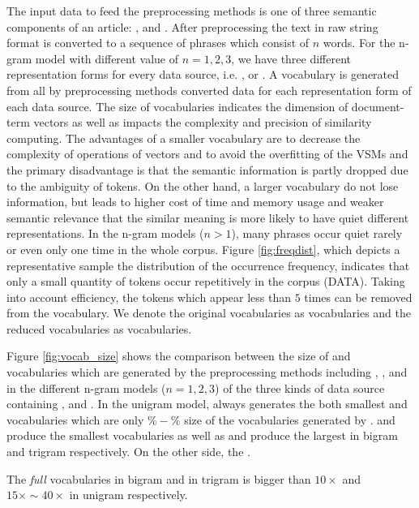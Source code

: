 The input data to feed the preprocessing methods is one of three semantic components of an article: \ititle{}, \isummary{} and \icontent{}. After preprocessing the text in raw string format is converted to a sequence of phrases which consist of $n$ words. For the n-gram model with different value of $n = 1, 2, 3$, we have three different representation forms for every data source, i.e. \ititle{}, \isummary{} or \icontent{}. A vocabulary is generated from all by preprocessing methods converted data for each representation form of each data source. The size of vocabularies indicates the dimension of document-term vectors as well as impacts the complexity and precision of similarity computing. The advantages of a smaller vocabulary are to decrease the complexity of operations of vectors and to avoid the overfitting of the VSMs and the primary disadvantage is that the semantic information is partly dropped due to the ambiguity of tokens. On the other hand, a larger vocabulary do not lose information, but leads to higher cost of time and memory usage and weaker semantic relevance that the similar meaning is more likely to have quiet different representations. In the n-gram models ($n > 1$), many phrases occur quiet rarely or even only one time in the whole corpus. Figure \ref{fig:freqdist}, which depicts a representative sample the distribution of the occurrence frequency, indicates that only a small quantity of tokens occur repetitively in the corpus (DATA). Taking into account efficiency, the tokens which appear less than $5$ times can be removed from the vocabulary. We denote the original vocabularies as \ifull{} vocabularies and the reduced vocabularies as \icommon{} vocabularies. 

Figure \ref{fig:vocab_size} shows the comparison between the size of \ifull{} and \icommon{} vocabularies which are generated by the preprocessing methods including \iSP{}, \iSE{}, \iST{} and \iSS{} in the different n-gram models ($n=1, 2, 3$) of the three kinds of data source containing \icontent{}, \ititle{} and \isummary{}. In the unigram model, \iSS always generates the both smallest \ifull{} and \icommon{} vocabularies which are only $\%-\%$ size of the vocabularies generated by \iSP{}. \iSE{} and \iSS{} produce the smallest \ifull{} vocabularies as well as \iST{} and \iSP{} produce the largest in bigram and trigram respectively. On the other side, the \iSP{}.

The \textit{full} vocabularies in bigram and in trigram is bigger than $10\times$ and $15\times \sim 40\times$ in unigram respectively. 


